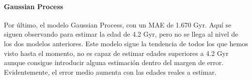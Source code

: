 \paragraph{Gaussian Process} 
Por último, el modelo Gaussian Process, con un MAE de 1.670 Gyr. Aquí se siguen observando para estimar la edad de 4.2 Gyr, pero no se llega al nivel de los dos modelos anteriores. Este modelo sigue la tendencia de todos los que hemos visto hasta el momento, no es capaz de estimar edades superiores a 4.2 Gyr aunque consigue introducir alguna estimación dentro del margen de error. Evidentemente, el error medio aumenta con las edades reales a estimar. %

\begin{figure}[h]
\begin{minipage}{.33\linewidth}
\centering
{}
\end{minipage}%
\begin{minipage}{.33\linewidth}
\centering
{}

\end{minipage}
\end{figure}
